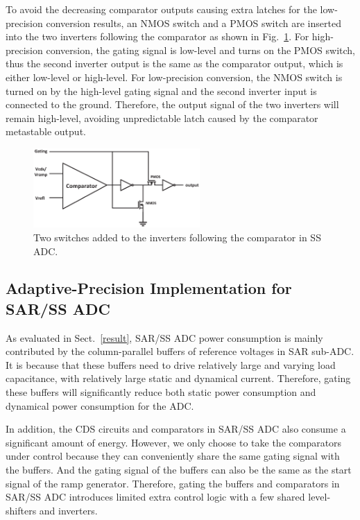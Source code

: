 To avoid the decreasing comparator outputs causing extra latches for the low-precision conversion results, an NMOS switch and a PMOS switch are inserted into the two inverters following the comparator as shown in Fig.~\ref{MATE}. 
For high-precision conversion, the gating signal is low-level and turns on the PMOS switch, thus the second inverter output is the same as the comparator output, which is either low-level or high-level. 
For low-precision conversion, the NMOS switch is turned on by the high-level gating signal and the second inverter input is connected to the ground. Therefore, the output signal of the two inverters will remain high-level, avoiding unpredictable latch caused by the comparator metastable output.

\begin{figure}[htbp]
	\centerline{\includegraphics[width=2.5in]{./Figures/MATE.eps}}
	\caption{Two switches added to the inverters following the comparator in SS ADC.}
	\label{MATE}
\end{figure} 

\subsection{Adaptive-Precision Implementation for SAR/SS ADC}\label{gating3}

As evaluated in Sect.~\ref{result}, SAR/SS ADC power consumption is mainly contributed by the column-parallel buffers of reference voltages in SAR sub-ADC.
It is because that these buffers need to drive relatively large and varying load capacitance, with relatively large static and dynamical current.
Therefore, gating these buffers will significantly reduce both static power consumption and dynamical power consumption for the ADC.

In addition, the CDS circuits and comparators in SAR/SS ADC also consume a significant amount of energy. However, we only choose to take the comparators under control because they can conveniently share the same gating signal with the buffers. And the gating signal of the buffers can also be the same as the start signal of the ramp generator. Therefore, gating the buffers and comparators in SAR/SS ADC introduces limited extra control logic with a few shared level-shifters and inverters.

